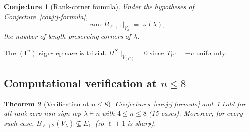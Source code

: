 \documentclass[11pt]{article}
\newtheorem{theorem}{Theorem}
\newtheorem{conjecture}[theorem]{Conjecture}
\theoremstyle{definition}
\begin{document}
\begin{conjecture}[Rank-corner formula]\label{conj:rank-corner}
Under the hypotheses of Conjecture~\ref{conj:j-formula},
\begin{equation}\label{eq:rank-corner}
   \mathrm{rank}\,B_{\ell+1}|_{V_\lambda} \;=\; \kappa(\lambda),
\end{equation}
the number of length-preserving corners of $\lambda$.
\end{conjecture}

The $(1^n)$ sign-rep case is trivial: $\Pi^{S_n}|_{V_{(1^n)}}=0$
since $T_iv=-v$ uniformly.

\subsection{Computational verification at $n\le 8$}

\begin{theorem}[Verification at $n\le 8$]\label{thm:verify}
Conjectures~\ref{conj:j-formula} and~\ref{conj:rank-corner} hold for
all rank-zero non-sign-rep $\lambda\vdash n$ with $4\le n\le 8$
(15 cases).  Moreover, for every such case,
$B_{\ell+2}(V_\lambda)\not\subseteq E_1^-$ (so $\ell+1$ is sharp).
\end{theorem}
\end{document}
